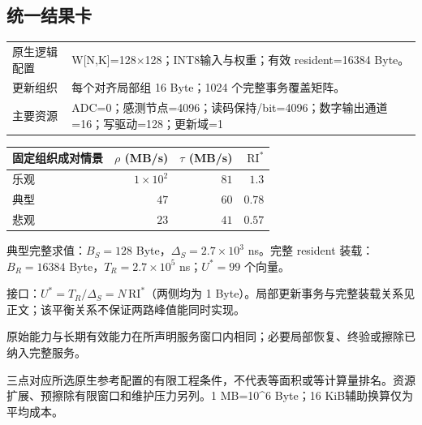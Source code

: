 \subsection*{统一结果卡}
\begingroup\small
\noindent\begin{tabularx}{\textwidth}{@{}p{24mm}X@{}}\toprule
原生逻辑配置 & W[N,K]=128×128；INT8输入与权重；有效 resident=16384 Byte。\\
更新组织 & 每个对齐局部组 16 Byte；1024 个完整事务覆盖矩阵。\\
主要资源 & ADC=0；感测节点=4096；读码保持/bit=4096；数字输出通道=16；写驱动=128；更新域=1\\
\bottomrule\end{tabularx}
\vspace{3mm}
\begin{center}\begin{tabular}{@{}lrrr@{}}\toprule
固定组织成对情景 & $\rho$ (MB/s) & $\tau$ (MB/s) & $\mathrm{RI}^{*}$\\\midrule
乐观 & $1\times10^{2}$ & $81$ & $1.3$\\
典型 & $47$ & $60$ & $0.78$\\
悲观 & $23$ & $41$ & $0.57$\\
\bottomrule\end{tabular}\end{center}
\noindent 典型完整求值：$B_S=128$ Byte，$\Delta_S=2.7\times10^{3}$ ns。完整 resident 装载：$B_R=16384$ Byte，$T_R=2.7\times10^{5}$ ns；$U^*=99$ 个向量。
\par\smallskip\noindent 接口：$U^*=T_R/\Delta_S=N\,\mathrm{RI}^*$（两侧均为 1 Byte）。局部更新事务与完整装载关系见正文；该平衡关系不保证两路峰值能同时实现。
\par\smallskip\noindent 原始能力与长期有效能力在所声明服务窗口内相同；必要局部恢复、终验或擦除已纳入完整服务。
\par\smallskip\noindent 三点对应所选原生参考配置的有限工程条件，不代表等面积或等计算量排名。资源扩展、预擦除有限窗口和维护压力另列。1 MB=10\textasciicircum{}6 Byte；16 KiB辅助换算仅为平均成本。
\endgroup
\clearpage

